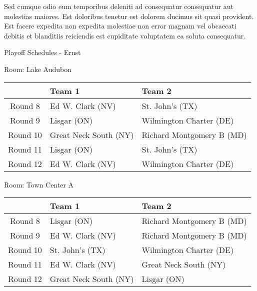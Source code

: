\documentclass{article}%
\begin{document}
\newline%
Sed cumque odio eum temporibus deleniti ad consequatur consequatur aut molestias maiores. Est doloribus tenetur est dolorem ducimus sit quasi provident. Est facere expedita non expedita molestiae non error magnam vel obcaecati debitis et blanditiis reiciendis est cupiditate voluptatem ea soluta consequatur.%
\newpage%
\begin{center}%
\begin{Huge}%
Playoff Schedules {-} Ernst%
\end{Huge}%
\end{center}%
\begin{flushleft}%
\begin{Large}%
Room: Lake Audubon%
\end{Large}%
\end{flushleft}%
\begin{tabularx}{\textwidth}{|c|Y|Y|}%
\hline%
&Team 1&Team 2\\%
\hline%
Round 8&Ed W. Clark (NV)&St. John's (TX)\\%
Round 9&Lisgar (ON)&Wilmington Charter (DE)\\%
Round 10&Great Neck South (NY)&Richard Montgomery B (MD)\\%
Round 11&Lisgar (ON)&St. John's (TX)\\%
Round 12&Ed W. Clark (NV)&Wilmington Charter (DE)\\%
\hline%
\end{tabularx}%
\vspace*{8pt}%
\linebreak%
\begin{flushleft}%
\begin{Large}%
Room: Town Center A%
\end{Large}%
\end{flushleft}%
\begin{tabularx}{\textwidth}{|c|Y|Y|}%
\hline%
&Team 1&Team 2\\%
\hline%
Round 8&Lisgar (ON)&Richard Montgomery B (MD)\\%
Round 9&Ed W. Clark (NV)&Richard Montgomery B (MD)\\%
Round 10&St. John's (TX)&Wilmington Charter (DE)\\%
Round 11&Ed W. Clark (NV)&Great Neck South (NY)\\%
Round 12&Great Neck South (NY)&Lisgar (ON)\\%
\hline%
\end{tabularx}%
\vspace*{8pt}%
\end{document}
